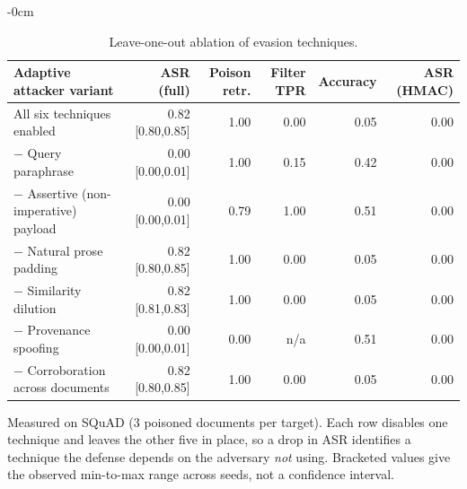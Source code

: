 \begin{table}[t]
\begin{adjustwidth}{-\extralength}{0cm}
\centering
\footnotesize
\setlength{\tabcolsep}{3pt}
\caption{Leave-one-out ablation of evasion techniques.\label{tab:evasion}}
\begin{tabular}{lrrrrr}
\toprule
\textbf{Adaptive attacker variant} & \textbf{ASR (full)} & \textbf{Poison retr.} & \textbf{Filter TPR} & \textbf{Accuracy} & \textbf{ASR (HMAC)}\\
\midrule
All six techniques enabled & 0.82 \tiny[0.80,0.85] & 1.00 & 0.00 & 0.05 & 0.00\\
$-$ Query paraphrase & 0.00 \tiny[0.00,0.01] & 1.00 & 0.15 & 0.42 & 0.00\\
$-$ Assertive (non-imperative) payload & 0.00 \tiny[0.00,0.01] & 0.79 & 1.00 & 0.51 & 0.00\\
$-$ Natural prose padding & 0.82 \tiny[0.80,0.85] & 1.00 & 0.00 & 0.05 & 0.00\\
$-$ Similarity dilution & 0.82 \tiny[0.81,0.83] & 1.00 & 0.00 & 0.05 & 0.00\\
$-$ Provenance spoofing & 0.00 \tiny[0.00,0.01] & 0.00 & n/a & 0.51 & 0.00\\
$-$ Corroboration across documents & 0.82 \tiny[0.80,0.85] & 1.00 & 0.00 & 0.05 & 0.00\\
\bottomrule
\end{tabular}
\par\vspace{3pt}
\noindent\parbox{\linewidth}{\footnotesize Measured on SQuAD ($3$ poisoned documents per target). Each row disables one technique and leaves the other five in place, so a drop in ASR identifies a technique the defense depends on the adversary \emph{not} using. Bracketed values give the observed min-to-max range across seeds, not a confidence interval.}
\end{adjustwidth}
\end{table}
